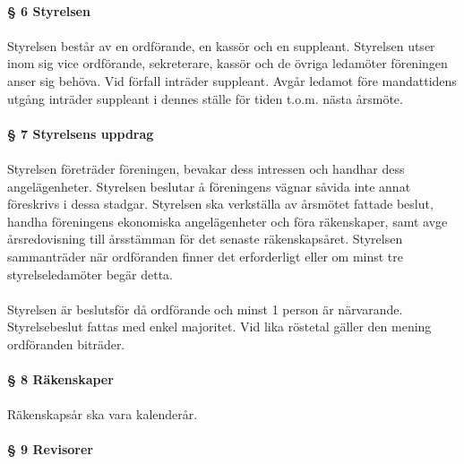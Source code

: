 \documentclass[12pt, a4paper]{article}
\begin{document}
\paragraph{§ 6 Styrelsen}
\paragraph{}
Styrelsen består av en ordförande, en kassör och en suppleant. Styrelsen utser inom sig vice ordförande, sekreterare, kassör och de övriga ledamöter
föreningen anser sig behöva. Vid förfall inträder suppleant. Avgår ledamot före mandattidens utgång inträder suppleant i dennes ställe för tiden
t.o.m. nästa årsmöte. 

\paragraph{§ 7 Styrelsens uppdrag}
\paragraph{}
Styrelsen företräder föreningen, bevakar dess intressen och handhar dess angelägenheter. Styrelsen beslutar å föreningens vägnar såvida inte annat
föreskrivs i dessa stadgar. Styrelsen ska verkställa av årsmötet fattade beslut, handha föreningens ekonomiska angelägenheter och föra räkenskaper,
samt avge årsredovisning till årsstämman för det senaste räkenskapsåret. Styrelsen sammanträder när ordföranden finner det erforderligt eller om
minst tre styrelseledamöter begär detta.

\paragraph{}
Styrelsen är beslutsför då ordförande och minst 1 person är närvarande. Styrelsebeslut fattas med enkel majoritet. Vid lika röstetal gäller den mening
ordföranden biträder.

\paragraph{§ 8 Räkenskaper}
\paragraph{}
Räkenskapsår ska vara kalenderår.

\paragraph{§ 9 Revisorer}
\end{document}
